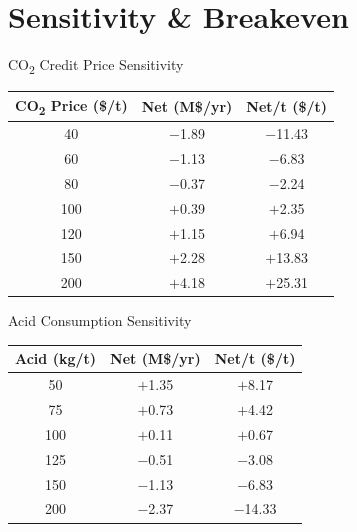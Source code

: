\documentclass[aspectratio=169]{beamer}
\begin{document}
\section{Sensitivity \& Breakeven}

\begin{frame}{CO\textsubscript{2} Credit Price Sensitivity}

\centering
\begin{tabular}{ccc}
\toprule
\textbf{CO\textsubscript{2} Price (\$/t)} & \textbf{Net (M\$/yr)} & \textbf{Net/t (\$/t)} \\
\midrule
40  & $-$1.89 & $-$11.43 \\
60  & $-$1.13 & $-$6.83 \\
\rowcolor{StepYellow!15}
80  & $-$0.37 & $-$2.24 \\
\rowcolor{StepGreen!10}
100 & $+$0.39 & $+$2.35 \\
120 & $+$1.15 & $+$6.94 \\
150 & $+$2.28 & $+$13.83 \\
200 & $+$4.18 & $+$25.31 \\
\bottomrule
\end{tabular}
\end{frame}

\begin{frame}{Acid Consumption Sensitivity}

\centering
\begin{tabular}{ccc}
\toprule
\textbf{Acid (kg/t)} & \textbf{Net (M\$/yr)} & \textbf{Net/t (\$/t)} \\
\midrule
\rowcolor{StepGreen!10}
50  & $+$1.35 & $+$8.17 \\
\rowcolor{StepGreen!10}
75  & $+$0.73 & $+$4.42 \\
\rowcolor{StepGreen!10}
100 & $+$0.11 & $+$0.67 \\
125 & $-$0.51 & $-$3.08 \\
150 & $-$1.13 & $-$6.83 \\
200 & $-$2.37 & $-$14.33 \\
\bottomrule
\end{tabular}
\end{frame}
\end{document}
